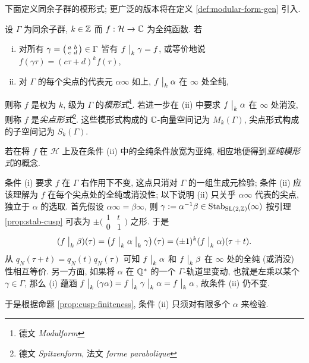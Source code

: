 下面定义同余子群的模形式; 更广泛的版本将在定义 \ref{def:modular-form-gen} 引入.
\begin{definition}[同余子群的模形式]\label{def:modular-form}
	   
	设 $\Gamma$ 为同余子群, $k \in \mathbb{Z}$ 而 $f: \mathcal{H} \to \mathbb{C}$ 为全纯函数. 若
	\begin{enumerate}[(i)]
		\item 对所有 $\gamma = \bigl(\begin{smallmatrix} a & b \\ c & d \end{smallmatrix}\bigr) \in \Gamma$ 皆有 $f\;\big|_{k} \;\gamma = f$, 或等价地说 $f(\gamma\tau) = (c\tau +d)^k f(\tau)$,
		\item 对 $\Gamma$ 的每个尖点的代表元 $\alpha\infty$ 如上, $f \;\big|_{k} \; \alpha$ 在 $\infty$ 处全纯,
	\end{enumerate}
	则称 $f$ 是权为 $k$, 级为 $\Gamma$ 的\emph{模形式}\footnote{德文 \textit{Modulform}}. 若进一步在 (ii) 中要求 $f \;\big|_{k} \; \alpha$ 在 $\infty$ 处消没, 则称 $f$ 是\emph{尖点形式}\footnote{德文 \textit{Spitzenform}, 法文 \textit{forme parabolique}}. 这些模形式构成的 $\mathbb{C}$-向量空间记为 $M_k(\Gamma)$, 尖点形式构成的子空间记为 $S_k(\Gamma)$.
	
	若在将 $f$ 在 $\mathcal{H}$ 上及在条件 (ii) 中的全纯条件放宽为亚纯, 相应地便得到\emph{亚纯模形式}的概念. 
\end{definition}

条件 (i) 要求 $f$ 在 $\Gamma$ 右作用下不变, 这点只消对 $\Gamma$ 的一组生成元检验; 条件 (ii) 应该理解为 $f$ 在每个尖点处的全纯或消没性; 以下说明 (ii) 只关乎 $\alpha\infty$ 代表的尖点, 独立于 $\alpha$ 的选取. 首先假设 $\alpha\infty = \beta\infty$, 则 $\gamma := \alpha^{-1} \beta \in \operatorname{Stab}_{\operatorname{SL}(2,\mathbb{Z})}(\infty)$ 按引理 \ref{prop:stab-cusp} 可表为 $\pm \bigl(\begin{smallmatrix} 1 & t \\ 0 & 1 \end{smallmatrix}\bigr)$ 之形. 于是
\[ (f\;\big|_{k} \;\beta)(\tau) = \left( f \;\big|_{k} \; \alpha \;\big|_{k} \;\gamma \right) (\tau) = (\pm 1)^k (f\;\big|_{k} \;\alpha)(\tau + t). \]
从 $q_N(\tau + t) = q_N(t) q_N(\tau)$ 可知 $f \;\big|_{k} \; \alpha$ 和 $f\;\big|_{k} \;\beta$ 在 $\infty$ 处的全纯 (或消没) 性相互等价. 另一方面, 如果将 $\alpha$ 在 $\mathbb{Q}^*$ 的一个 $\Gamma$-轨道里变动, 也就是左乘以某个 $\gamma \in \Gamma$, 那么 (i) 蕴涵 $f\;\big|_{k} \;(\gamma\alpha) = f\;\big|_{k} \;\gamma \;\big|_{k} \;\alpha = f\;\big|_{k} \;\alpha$, 故条件 (ii) 仍不变.

于是根据命题 \ref{prop:cusp-finiteness}, 条件 (ii) 只须对有限多个 $\alpha$ 来检验.

